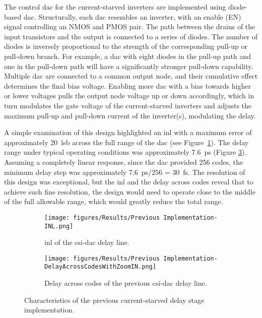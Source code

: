 The control \gls{dac} for the current-starved inverters are implemented using diode-based \gls{dac}. Structurally, each \gls{dac} resembles an inverter, with an enable (EN) signal controlling an NMOS and PMOS pair. The path between the drains of the input transistors and the output is connected to a series of diodes. The number of diodes is inversely proportional to the strength of the corresponding pull-up or pull-down branch. For example, a \gls{dac} with eight diodes in the pull-up path and one in the pull-down path will have a significantly stronger pull-down capability. Multiple \gls{dac} are connected to a common output node, and their cumulative effect determines the final bias voltage. Enabling more \gls{dac} with a bias towards higher or lower voltages pulls the output node voltage up or down accordingly, which in turn modulates the gate voltage of the current-starved inverters and adjusts the maximum pull-up and pull-down current of the inverter(s), modulating the delay.

A simple examination of this design highlighted an \gls{inl} with a maximum error of approximately 20~\gls{lsb} across the full range of the \gls{dac} (see Figure~\ref{fig:current_starved_dac_inl}). The delay range under typical operating conditions was approximately 7.6~ps (Figure \ref{fig:current_starved_dac_delay_range}). Assuming a completely linear response, since the \gls{dac} provided 256 codes, the minimum delay step was approximately 7.6~ps/256 = 30~fs. The resolution of this design was exceptional, but the \gls{inl} and the delay across codes reveal that to achieve such fine resolution, the design would need to operate close to the middle of the full allowable range, which would greatly reduce the total range.

\begin{figure}[h]

  \begin{subfigure}{0.4\linewidth}
    \centering
    \texttt{[image: figures/Results/Previous Implementation-INL.png]}
    \caption{\gls{inl} of the \gls{csi}-\gls{dac} delay line.}
    \label{fig:current_starved_dac_inl}
  \end{subfigure}
  \hfill
  \begin{subfigure}{0.4\linewidth}
    \centering
    \texttt{[image: figures/Results/Previous Implementation-DelayAcrossCodesWithZoomIN.png]}
    \caption{Delay across codes of the previous \gls{csi}-\gls{dac} delay line.}
    \label{fig:current_starved_dac_delay_range}
  \end{subfigure}

\caption{Characteristics of the previous current-starved delay stage implementation.}
\end{figure}


